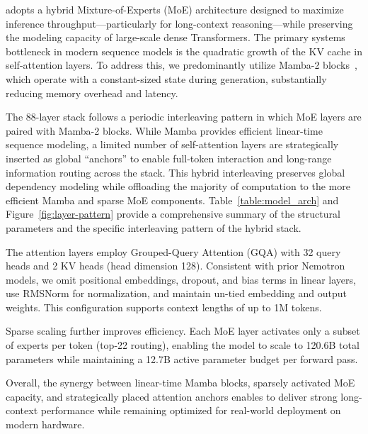 \ourmodel adopts a hybrid Mixture-of-Experts (MoE) architecture designed to maximize inference throughput—particularly for long-context reasoning—while preserving the modeling capacity of large-scale dense Transformers. The primary systems bottleneck in modern sequence models is the quadratic growth of the KV cache in self-attention layers. To address this, we predominantly utilize Mamba-2 blocks~\citep{dao2024transformersssmsgeneralizedmodels}, which operate with a constant-sized state during generation, substantially reducing memory overhead and latency.

The 88-layer stack follows a periodic interleaving pattern in which MoE layers are paired with Mamba-2 blocks. While Mamba provides efficient linear-time sequence modeling, a limited number of self-attention layers are strategically inserted as global ``anchors'' to enable full-token interaction and long-range information routing across the stack. This hybrid interleaving preserves global dependency modeling while offloading the majority of computation to the more efficient Mamba and sparse MoE components. Table~\ref{table:model_arch} and Figure~\ref{fig:layer-pattern} provide a comprehensive summary of the structural parameters and the specific interleaving pattern of the hybrid stack.

The attention layers employ Grouped-Query Attention (GQA) with 32 query heads and 2 KV heads (head dimension 128). Consistent with prior Nemotron models, we omit positional embeddings, dropout, and bias terms in linear layers, use RMSNorm for normalization, and maintain un-tied embedding and output weights. This configuration supports context lengths of up to 1M tokens.

Sparse scaling further improves efficiency. Each MoE layer activates only a subset of experts per token (top-22 routing), enabling the model to scale to 120.6B total parameters while maintaining a 12.7B active parameter budget per forward pass. %

Overall, the synergy between linear-time Mamba blocks, sparsely activated MoE capacity, and strategically placed attention anchors enables \ourmodel to deliver strong long-context performance while remaining optimized for real-world deployment on modern hardware.



